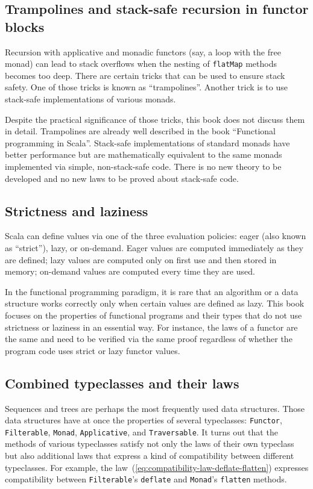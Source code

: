 \subsection{Trampolines and stack-safe recursion in functor blocks}

Recursion with applicative and monadic functors (say, a loop with
the free monad) can lead to stack overflows when the nesting of \lstinline!flatMap!
methods becomes too deep. There are certain tricks that can be used
to ensure stack safety. One of those tricks is known as \textsf{``}trampolines\textsf{''}.
Another trick is to use stack-safe implementations of various monads. 

Despite the practical significance of those tricks, this book does
not discuss them in detail. Trampolines are already well described
in the book \textsf{``}Functional programming in Scala\textsf{''}. Stack-safe implementations
of standard monads have better performance but are mathematically
equivalent to the same monads implemented via simple, non-stack-safe
code. There is no new theory to be developed and no new laws to be
proved about stack-safe code.

\subsection{Strictness and laziness}

Scala can define values via one of the three evaluation policies:
eager (also known as \textsf{``}strict\textsf{''}), lazy, or on-demand. Eager values
are computed immediately as they are defined; lazy values are computed
only on first use and then stored in memory; on-demand values are
computed every time they are used. 

In the functional programming paradigm, it is rare that an algorithm
or a data structure works correctly only when certain values are defined
as lazy. This book focuses on the properties of functional programs
and their types that do not use strictness or laziness in an essential
way. For instance, the laws of a functor are the same and need to
be verified via the same proof regardless of whether the program code
uses strict or lazy functor values. 

\subsection{Combined typeclasses and their laws}

Sequences and trees are perhaps the most frequently used data structures.
Those data structures have at once the properties of several typeclasses:
\lstinline!Functor!, \lstinline!Filterable!, \lstinline!Monad!,
\lstinline!Applicative!, and \lstinline!Traversable!. It turns out
that the methods of various typeclasses satisfy not only the laws
of their own typeclass but also additional laws that express a kind
of compatibility between different typeclasses. For example, the law~(\ref{eq:compatibility-law-deflate-flatten})
expresses compatibility between \lstinline!Filterable!\textsf{'}s \lstinline!deflate!
and \lstinline!Monad!\textsf{'}s \lstinline!flatten! methods.

